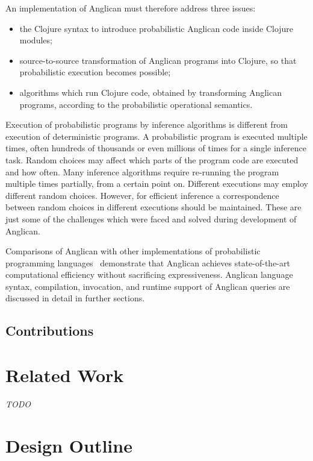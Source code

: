 \documentclass[preprint]{sigplanconf}
\begin{document}
An implementation of Anglican must therefore address three issues:
\begin{itemize}
    \item the Clojure syntax to introduce probabilistic Anglican
        code inside Clojure modules;
    \item source-to-source transformation of Anglican programs
        into Clojure, so that probabilistic execution becomes
        possible;
    \item algorithms which run Clojure code, obtained by
        transforming Anglican programs, according to the
        probabilistic operational semantics.
\end{itemize}
Execution of probabilistic programs by inference algorithms is
different from execution of deterministic programs.  A
probabilistic program is executed multiple times, often hundreds
of thousands or even millions of times for a single inference
task. Random choices may affect which parts of the program code
are executed and how often. Many inference algorithms require
re-running the program multiple times partially, from a certain
point on.  Different executions may employ different random
choices. However, for efficient inference a correspondence
between random choices in different executions should be
maintained. These are just some of the challenges which were
faced and solved during development of Anglican.

Comparisons of Anglican with other implementations of
probabilistic programming languages~\cite{SGG15}\cite[pp.
32--33]{P16} demonstrate that Anglican achieves state-of-the-art
computational efficiency without sacrificing expressiveness.
Anglican language syntax, compilation, invocation, and runtime
support of Anglican queries are discussed in detail in further
sections.

\subsection*{Contributions}

\section{Related Work}
\label{sec:related}

{\it TODO}

\section{Design Outline}
\label{sec:design}
\end{document}
